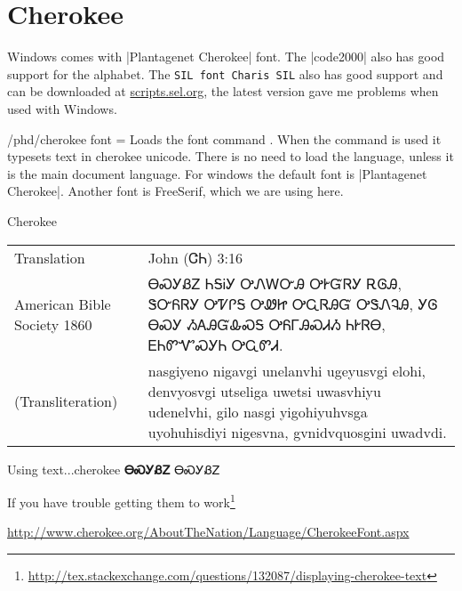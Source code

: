 
\section{Cherokee}
\label{sec:cherokee}
Windows comes with |Plantagenet Cherokee| font. The |code2000| also has good support for the alphabet. The \texttt{SIL font Charis SIL} also has good support and can be downloaded at \href{http://scripts.sil.org/cms/scripts/page.php?item_id=CharisSIL_download}{scripts.sel.org}, the latest version gave me problems when used with Windows. 

  
\def\textcherokee#1{{\cherokee   #1}}


\begin{key}{/phd/cherokee font = } Loads the font
command \cmd{\cherokee}. When the command is used it typesets text in
cherokee unicode. There is no need to load the language, unless it is the main document language. For windows the default font is  |Plantagenet Cherokee|. Another font is FreeSerif, which we are using here.
\end{key}

\begin{scriptexample}[]{Cherokee}
{\cherokee
\begin{tabular}{lp{8.5cm}}
Translation	  &John (ᏣᏂ) 3:16\\
American Bible Society 1860	&ᎾᏍᎩᏰᏃ ᏂᎦᎥᎩ ᎤᏁᎳᏅᎯ ᎤᎨᏳᏒᎩ ᎡᎶᎯ, ᏕᏅᏲᏒᎩ ᎤᏤᎵᎦ ᎤᏪᏥ ᎤᏩᏒᎯᏳ ᎤᏕᏁᎸᎯ, ᎩᎶ ᎾᏍᎩ ᏱᎪᎯᏳᎲᏍᎦ ᎤᏲᎱᎯᏍᏗᏱ ᏂᎨᏒᎾ, ᎬᏂᏛᏉᏍᎩᏂ ᎤᏩᏛᏗ.\\

(Transliteration)	& nasgiyeno nigavgi unelanvhi ugeyusvgi elohi, denvyosvgi utseliga uwetsi uwasvhiyu udenelvhi, gilo nasgi yigohiyuhvsga uyohuhisdiyi nigesvna, gvnidvquosgini uwadvdi.\\
\end{tabular}}
\end{scriptexample}

\begin{texexample}{Using text...}{cherokee}
\bgroup
\cherokee \large\textbf{ᎾᏍᎩᏰᏃ}
\textcherokee{ᎾᏍᎩᏰᏃ}
\egroup
\end{texexample}

If you have trouble getting them to work\footnote{\url{http://tex.stackexchange.com/questions/132087/displaying-cherokee-text}}

\url{http://www.cherokee.org/AboutTheNation/Language/CherokeeFont.aspx}



